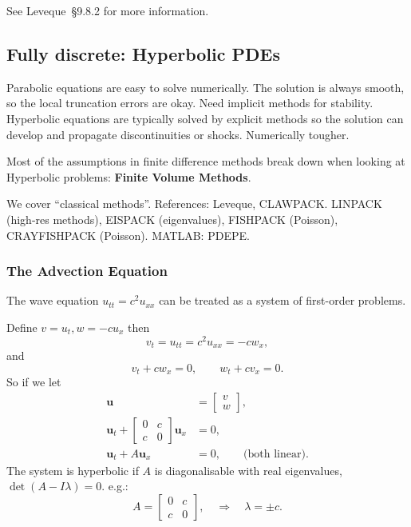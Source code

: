\documentclass[12pt, a4paper]{article}
\theoremstyle{definition}
\theoremstyle{remark}
\numberwithin{equation}{section}
\begin{document}
See Leveque~\S9.8.2 for more information.

\newpage
\subsection{Fully discrete: Hyperbolic PDEs}

Parabolic equations are easy to solve numerically. The solution is always smooth, so the
local truncation errors are okay. 
Need implicit methods for stability. 
Hyperbolic equations are typically solved by explicit methods so the solution can develop and propagate discontinuities or shocks. 
Numerically tougher.

Most of the assumptions in finite difference methods break down when looking at Hyperbolic problems: {\bf Finite Volume Methods}.

We cover ``classical methods''. References: Leveque, CLAWPACK.
LINPACK (high-res methods), EISPACK (eigenvalues), FISHPACK (Poisson),
CRAYFISHPACK (Poisson). MATLAB: PDEPE.

\newpage
\subsubsection{The Advection Equation}
The wave equation $u_{tt} = c^2 u_{xx} $ can be treated as a system of first-order problems.

Define $v = u_t, w = -cu_x$ then
$$v_t = u_{tt} = c^2 u_{xx} = -cw_x,$$
and
$$v_t + cw_x = 0, \qquad w_t + cv_x = 0. $$
So if we let
\begin{align*}
\mathbf{u} &= \left[ \begin{array}{c} v \\ w \end{array} \right], \\
\mathbf{u}_t + \left[ \begin{array}{cc} 0 & c \\ c & 0 \end{array} \right] \mathbf{u}_x &= 0, \\
\mathbf{u}_t + A \mathbf{u}_x &= 0, \qquad \text{(both linear).}
\end{align*}
The system is hyperbolic if $A$ is diagonalisable with real eigenvalues, \mbox{$\det(A - I\lambda) = 0$}.
e.g.:
$$ A = \left[ \begin{array}{cc} 0 & c \\ c & 0 \end{array} \right], \quad \Longrightarrow \quad \lambda = \pm c. $$
\end{document}
